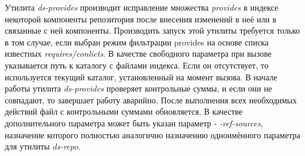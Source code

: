 Утилита \textit{ds-provides} производит исправление множества \textit{provides} в индексе
некоторой компоненты репозитория после внесения изменений в неё или
в связанные с ней компоненты. Производить запуск этой утилиты требуется
только в том случае, если выбран режим фильтрации provides на основе
списка известных \textit{requires/conlicts}. В качестве свободного параметра при 
вызове указывается путь к каталогу с файлами индекса. Если он отсутствует,
то используется текущий каталог, установленный на момент вызова. В начале
работы утилита \textit{ds-provides} проверяет контрольные суммы, и если они
не совпадают, то завершает работу аварийно. После выполнения всех 
необходимых действий файл с контрольными суммами обновляется. В качестве
дополнительного параметра может быть указан параметр - \textit{-ref-sources},
назначение которого полностью аналогично назначению одноимённого параметра
для утилиты \textit{ds-repo}.



\newpage









